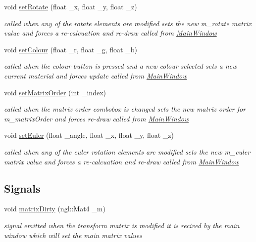 \begin{DoxyCompactItemize}
void \hyperlink{classGLWindow_aeb38f75f4aabaa234c6edfd47961ffd3}{set\+Rotate} (float \+\_\+x, float \+\_\+y, float \+\_\+z)
\begin{DoxyCompactList}\small\item\em called when any of the rotate elements are modified sets the new m\+\_\+rotate matrix value and forces a re-\/calcuation and re-\/draw called from \hyperlink{classMainWindow}{Main\+Window} \end{DoxyCompactList}\item 
void \hyperlink{classGLWindow_aa1349f743c7896eae48d9de70bc3a435}{set\+Colour} (float \+\_\+r, float \+\_\+g, float \+\_\+b)
\begin{DoxyCompactList}\small\item\em called when the colour button is pressed and a new colour selected sets a new current material and forces update called from \hyperlink{classMainWindow}{Main\+Window} \end{DoxyCompactList}\item 
void \hyperlink{classGLWindow_a1d0cb30ace164133ef57a191f6365fb7}{set\+Matrix\+Order} (int \+\_\+index)
\begin{DoxyCompactList}\small\item\em called when the matrix order combobox is changed sets the new matrix order for m\+\_\+matrix\+Order and forces re-\/draw called from \hyperlink{classMainWindow}{Main\+Window} \end{DoxyCompactList}\item 
void \hyperlink{classGLWindow_aaf083de2d54fb667a530976735ef459d}{set\+Euler} (float \+\_\+angle, float \+\_\+x, float \+\_\+y, float \+\_\+z)
\begin{DoxyCompactList}\small\item\em called when any of the euler rotation elements are modified sets the new m\+\_\+euler matrix value and forces a re-\/calcuation and re-\/draw called from \hyperlink{classMainWindow}{Main\+Window} \end{DoxyCompactList}\end{DoxyCompactItemize}
\subsection*{Signals}
\begin{DoxyCompactItemize}
\item 
void \hyperlink{classGLWindow_a305540b7cf1841e24163be0a9a7e4956}{matrix\+Dirty} (ngl\+::\+Mat4 \+\_\+m)
\begin{DoxyCompactList}\small\item\em signal emitted when the transform matrix is modified it is recived by the main window which will set the main matrix values \end{DoxyCompactList}\end{DoxyCompactItemize}
